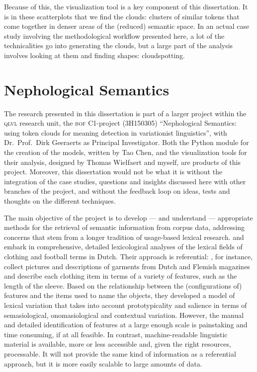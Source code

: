 \documentclass[
]{book}
\begin{document}
Because of this, the visualization tool is a key component of this dissertation. It is in these scatterplots that we find the clouds: clusters of similar tokens that come together in denser areas of the (reduced) semantic space. In an actual case study involving the methodological workflow presented here, a lot of the technicalities go into generating the clouds, but a large part of the analysis involves looking at them and finding shapes: cloudspotting.

\hypertarget{nephosem}{%
\section{Nephological Semantics}\label{nephosem}}

The research presented in this dissertation is part of a larger project within the \textsc{qlvl} research unit, the \textsc{bof} C1-project (3H150305) ``Nephological Semantics: using token clouds for meaning detection in variationist linguistics'', with Dr.~Prof.~Dirk Geeraerts as Principal Investigator. Both the Python module for the creation of the models, written by Tao Chen, and the visualization tools for their analysis, designed by Thomas Wielfaert and myself, are products of this project. Moreover, this dissertation would not be what it is without the integration of the case studies, questions and insights discussed here with other branches of the project, and without the feedback loop on ideas, tests and thoughts on the different techniques.

The main objective of the project is to develop --- and understand --- appropriate methods for the retrieval of semantic information from corpus data, addressing concerns that stem from a longer tradition of usage-based lexical research. \textcite{geeraerts.etal_1994} and \textcite{geeraerts.etal_1999} embark in comprehensive, detailed lexicological analyses of the lexical fields of clothing and football terms in Dutch. Their approach is referential: \textcite{geeraerts.etal_1994}, for instance, collect pictures and descriptions of garments from Dutch and Flemish magazines and describe each clothing item in terms of a variety of features, such as the length of the sleeve. Based on the relationship between the (configurations of) features and the items used to name the objects, they developed a model of lexical variation that takes into account prototypicality and salience in terms of semasiological, onomasiological and contextual variation. However, the manual and detailed identification of features at a large enough scale is painstaking and time consuming, if at all feasible. In contrast, machine-readable linguistic material is available, more or less accessible and, given the right resources, processable. It will not provide the same kind of information as a referential approach, but it is more easily scalable to large amounts of data.
\end{document}
